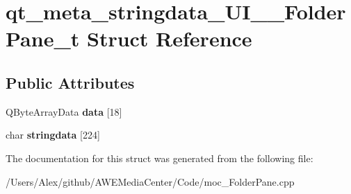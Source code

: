 \hypertarget{structqt__meta__stringdata___u_i_____folder_pane__t}{\section{qt\-\_\-meta\-\_\-stringdata\-\_\-\-U\-I\-\_\-\-\_\-\-Folder\-Pane\-\_\-t Struct Reference}
\label{structqt__meta__stringdata___u_i_____folder_pane__t}
}
\subsection*{Public Attributes}
\begin{DoxyCompactItemize}
\item 
\hypertarget{structqt__meta__stringdata___u_i_____folder_pane__t_aec7b5529fe3054c5c5dc3620032a575d}{Q\-Byte\-Array\-Data {\bfseries data} \mbox{[}18\mbox{]}}\label{structqt__meta__stringdata___u_i_____folder_pane__t_aec7b5529fe3054c5c5dc3620032a575d}

\item 
\hypertarget{structqt__meta__stringdata___u_i_____folder_pane__t_a46a26cce39864b1c325f719e9b4eab82}{char {\bfseries stringdata} \mbox{[}224\mbox{]}}\label{structqt__meta__stringdata___u_i_____folder_pane__t_a46a26cce39864b1c325f719e9b4eab82}

\end{DoxyCompactItemize}


The documentation for this struct was generated from the following file\-:\begin{DoxyCompactItemize}
\item 
/\-Users/\-Alex/github/\-A\-W\-E\-Media\-Center/\-Code/moc\-\_\-\-Folder\-Pane.\-cpp\end{DoxyCompactItemize}
